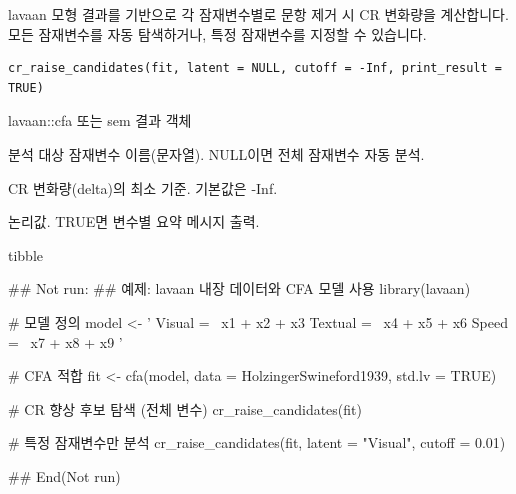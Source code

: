 \documentclass[a4paper]{book}
\begin{document}
%
\begin{Description}
lavaan 모형 결과를 기반으로 각 잠재변수별로 문항 제거 시 CR 변화량을 계산합니다.
모든 잠재변수를 자동 탐색하거나, 특정 잠재변수를 지정할 수 있습니다.
\end{Description}
%
\begin{Usage}
\begin{verbatim}
cr_raise_candidates(fit, latent = NULL, cutoff = -Inf, print_result = TRUE)
\end{verbatim}
\end{Usage}
%
\begin{Arguments}
\begin{ldescription}
\item[\code{fit}] lavaan::cfa 또는 sem 결과 객체

\item[\code{latent}] 분석 대상 잠재변수 이름(문자열). NULL이면 전체 잠재변수 자동 분석.

\item[\code{cutoff}] CR 변화량(delta)의 최소 기준. 기본값은 -Inf.

\item[\code{print\_result}] 논리값. TRUE면 변수별 요약 메시지 출력.
\end{ldescription}
\end{Arguments}
%
\begin{Value}
tibble
\end{Value}
%
\begin{Examples}
\begin{ExampleCode}
\#\# Not run: 
## 예제: lavaan 내장 데이터와 CFA 모델 사용
library(lavaan)

# 모델 정의
model <- '
  Visual  =~ x1 + x2 + x3
  Textual =~ x4 + x5 + x6
  Speed   =~ x7 + x8 + x9
'

# CFA 적합
fit <- cfa(model, data = HolzingerSwineford1939, std.lv = TRUE)

# CR 향상 후보 탐색 (전체 변수)
cr_raise_candidates(fit)

# 특정 잠재변수만 분석
cr_raise_candidates(fit, latent = "Visual", cutoff = 0.01)

## End(Not run)
\end{ExampleCode}
\end{Examples}
\end{document}

